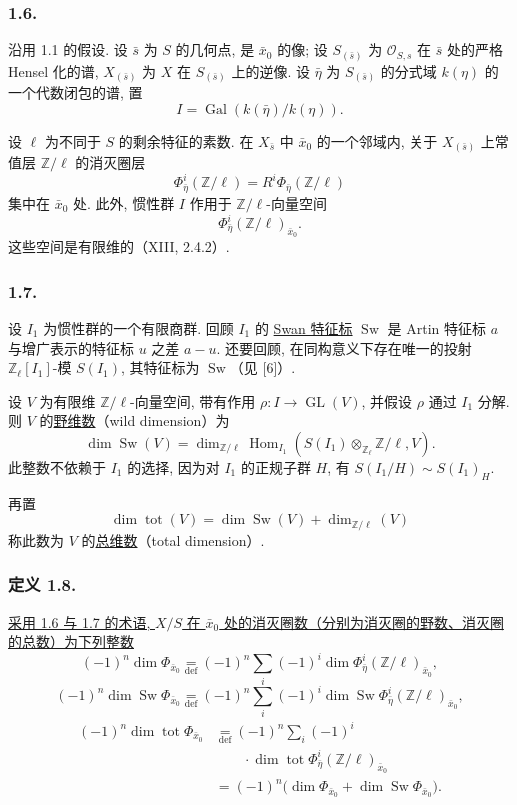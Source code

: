\subsubsection*{1.6.}
沿用 1.1 的假设. 设 $\bar s$ 为 $S$ 的几何点, 是 $\bar x_0$ 的像; 设 $S_{(\bar s)}$ 为 $\mathcal O_{S,s}$ 在 $\bar s$ 处的严格 Hensel 化的谱, $X_{(\bar s)}$ 为 $X$ 在 $S_{(\bar s)}$ 上的逆像. 设 $\bar\eta$ 为 $S_{(\bar s)}$ 的分式域 $k(\eta)$ 的一个代数闭包的谱, 置
\[
I=\operatorname{Gal}(k(\bar\eta)/k(\eta)).
\]

设 $\ell$ 为不同于 $S$ 的剩余特征的素数. 在 $X_{\bar s}$ 中 $\bar x_0$ 的一个邻域内, 关于 $X_{(\bar s)}$ 上常值层 $\mathbb Z/\ell$ 的消灭圈层
\[
\Phi^i_{\bar\eta}(\mathbb Z/\ell)
=R^i\Phi_{\bar\eta}(\mathbb Z/\ell)
\]
集中在 $\bar x_0$ 处. 此外, 惯性群 $I$ 作用于 $\mathbb Z/\ell$-向量空间
\[
\Phi^i_{\bar\eta}(\mathbb Z/\ell)_{\bar x_0}.
\]
这些空间是有限维的（XIII, 2.4.2）.

\subsubsection*{1.7.}
设 $I_1$ 为惯性群的一个有限商群. 回顾 $I_1$ 的 \underline{Swan 特征标} $\operatorname{Sw}$ 是 Artin 特征标 $a$ 与增广表示的特征标 $u$ 之差 $a-u$. 还要回顾, 在同构意义下存在唯一的投射 $\mathbb Z_\ell[I_1]$-模 $S(I_1)$, 其特征标为 $\operatorname{Sw}$（见 [6]）.

设 $V$ 为有限维 $\mathbb Z/\ell$-向量空间, 带有作用 $\rho:I\to\operatorname{GL}(V)$, 并假设 $\rho$ 通过 $I_1$ 分解. 则 $V$ 的\underline{野维数}（wild dimension）为
\begin{equation}\tag{1.7.1}
\dim\operatorname{Sw}(V)
=\dim_{\mathbb Z/\ell}
\operatorname{Hom}_{I_1}\!\left(
S(I_1)\otimes_{\mathbb Z_\ell}\mathbb Z/\ell,V\right).
\end{equation}
此整数不依赖于 $I_1$ 的选择, 因为对 $I_1$ 的正规子群 $H$, 有 $S(I_1/H)\sim S(I_1)_H$.

再置
\[
\dim\operatorname{tot}(V)
=\dim\operatorname{Sw}(V)+\dim_{\mathbb Z/\ell}(V)
\]
称此数为 $V$ 的\underline{总维数}（total dimension）.

\subsubsection*{定义 1.8.}
\underline{采用 1.6 与 1.7 的术语, $X/S$ 在 $\bar x_0$ 处的消灭圈数（分别为消灭圈的野数、消灭圈的总数）为下列整数}
\[
(-1)^n\dim\Phi_{\bar x_0}
\underset{\mathrm{def}}{=}
(-1)^n\sum_i(-1)^i
\dim\Phi^i_{\bar\eta}(\mathbb Z/\ell)_{\bar x_0},
\]
\[
(-1)^n\dim\operatorname{Sw}\Phi_{\bar x_0}
\underset{\mathrm{def}}{=}
(-1)^n\sum_i(-1)^i
\dim\operatorname{Sw}
\Phi^i_{\bar\eta}(\mathbb Z/\ell)_{\bar x_0},
\]
\[
\begin{aligned}
(-1)^n\dim\operatorname{tot}\Phi_{\bar x_0}
&\underset{\mathrm{def}}{=}
(-1)^n\sum_i(-1)^i\\[-2pt]
&\qquad{}\cdot\dim\operatorname{tot}
\Phi^i_{\bar\eta}(\mathbb Z/\ell)_{\bar x_0}\\
&=(-1)^n\bigl(
\dim\Phi_{\bar x_0}+\dim\operatorname{Sw}\Phi_{\bar x_0}
\bigr).
\end{aligned}
\]

